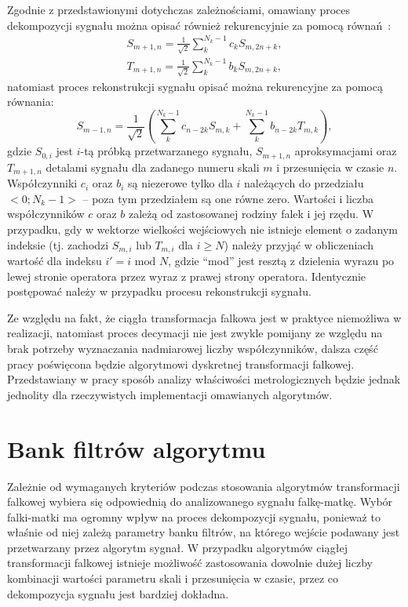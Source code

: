 Zgodnie z przedstawionymi dotychczas zależnościami, omawiany proces dekompozycji sygnału można opisać również rekurencyjnie za pomocą równań~\cite{wallen_handbook}:
\begin{gather}
S_{m+1,n} = \frac{1}{\sqrt{2}} \sum _{k} ^{N_k-1} c_{k} S_{m,2n+k} \label{eq:dwt_aproxrek}, \\
T_{m+1,n} = \frac{1}{\sqrt{2}} \sum _{k} ^{N_k-1} b_{k} S_{m,2n+k} \label{eq:dwt_detailrek},
\end{gather}
natomiast proces rekonstrukcji sygnału opisać można rekurencyjne za pomocą równania:
\begin{equation}
S_{m-1,n} = \frac{1}{\sqrt{2}} \left( \sum _{k} ^{N_k-1} c_{n-2k} S_{m,k} + \sum _{k} ^{N_k-1} b_{n-2k} T_{m,k} \right) \label{eq:dwt_reconrek},
\end{equation}
gdzie $S_{0,i}$ jest $i$-tą próbką przetwarzanego sygnału, $S_{m+1,n}$ aproksymacjami oraz $T_{m+1,n}$ detalami sygnału dla zadanego numeru skali $m$ i przesunięcia w czasie $n$. Współczynniki $c_i$ oraz $b_i$ są niezerowe tylko dla $i$ należących do przedziału $<0;N_k-1>$ -- poza tym przedziałem są one równe zero. Wartości i liczba współczynników $c$ oraz $b$ zależą od zastosowanej rodziny falek i jej rzędu. W przypadku, gdy w wektorze wielkości wejściowych nie istnieje element o zadanym indeksie (tj. zachodzi $S_{m,i}$ lub $T_{m,i}$ dla $i \ge N$) należy przyjąć w obliczeniach wartość dla indeksu $i' = i \text{ mod } N$, gdzie \enquote{mod} jest resztą z dzielenia wyrazu po lewej stronie operatora przez wyraz z prawej strony operatora. Identycznie postępować należy w przypadku procesu rekonstrukcji sygnału.

Ze względu na fakt, że ciągła transformacja falkowa jest w praktyce niemożliwa w realizacji, natomiast proces decymacji nie jest zwykle pomijany ze względu na brak potrzeby wyznaczania nadmiarowej liczby współczynników, dalsza część pracy poświęcona będzie algorytmowi dyskretnej transformacji falkowej. Przedstawiany w pracy sposób analizy właściwości metrologicznych będzie jednak jednolity dla rzeczywistych implementacji omawianych algorytmów.

\section{Bank filtrów algorytmu}

Zależnie od wymaganych kryteriów podczas stosowania algorytmów transformacji falkowej wybiera się odpowiednią do analizowanego sygnału falkę-matkę. Wybór falki-matki ma ogromny wpływ na proces dekompozycji sygnału, ponieważ to właśnie od niej zależą parametry banku filtrów, na którego wejście podawany jest przetwarzany przez algorytm sygnał. W przypadku algorytmów ciągłej transformacji falkowej istnieje możliwość zastosowania dowolnie dużej liczby kombinacji wartości parametru skali i przesunięcia w czasie, przez co dekompozycja sygnału jest bardziej dokładna.

